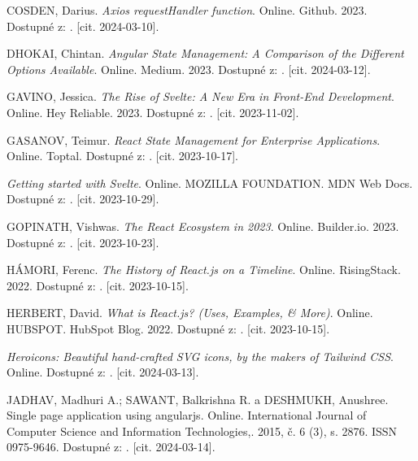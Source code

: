 \begin{thebibliography}{99}
\textsc{COSDEN}, Darius. \emph{Axios requestHandler function}. Online. Github. 2023. Dostupné z: . [cit. 2024-03-10].

\textsc{DHOKAI}, Chintan. \emph{Angular State Management: A Comparison of the Different Options Available}. Online. Medium. 2023. Dostupné z: . [cit. 2024-03-12].

\textsc{GAVINO}, Jessica. \emph{The Rise of Svelte: A New Era in Front-End Development}. Online. Hey Reliable. 2023. Dostupné z: . [cit. 2023-11-02].

\textsc{GASANOV}, Teimur. \emph{React State Management for Enterprise Applications}. Online. Toptal. Dostupné z: . [cit. 2023-10-17].

\emph{Getting started with Svelte}. Online. MOZILLA FOUNDATION. MDN Web Docs. Dostupné z: . [cit. 2023-10-29].

\textsc{GOPINATH}, Vishwas. \emph{The React Ecosystem in 2023}. Online. Builder.io. 2023. Dostupné z: . [cit. 2023-10-23].

\textsc{HÁMORI}, Ferenc. \emph{The History of React.js on a Timeline}. Online. RisingStack. 2022. Dostupné z: . [cit. 2023-10-15].

\textsc{HERBERT}, David. \emph{What is React.js? (Uses, Examples, \& More)}. Online. HUBSPOT. HubSpot Blog. 2022. Dostupné z: . [cit. 2023-10-15].

\emph{Heroicons: Beautiful hand-crafted SVG icons, by the makers of Tailwind CSS}. Online. Dostupné z: . [cit. 2024-03-13].

\textsc{JADHAV}, Madhuri A.; \textsc{SAWANT}, Balkrishna R. a \textsc{DESHMUKH}, Anushree. Single page application using angularjs. Online. International Journal of Computer Science and Information Technologies,. 2015, č. 6 (3), s. 2876. ISSN 0975-9646. 
Dostupné z: . [cit. 2024-03-14].


\end{thebibliography}
